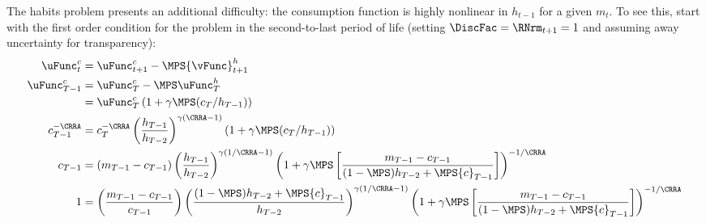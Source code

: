 \documentclass[\econtexRoot/SolvingMicroDSOPs]{subfiles}
\begin{document}
The habits problem presents an additional difficulty: the consumption
function is highly nonlinear in $h_{t-1}$ for a given ${m}_{t}$.   To
see this, start with the first order condition for the problem in the
second-to-last period of life (setting $\DiscFac = \RNrm_{t+1} = 1$ and assuming
away uncertainty for transparency):
\begin{equation}\begin{gathered}\begin{aligned}
  \uFunc_{t}^{c}    & = \uFunc_{t+1}^{c} - \MPS {\vFunc}_{t+1}^{h}
  \\      \uFunc_{T-1}^{c}  & = \uFunc_{T}^{c} - \MPS \uFunc_{T}^{h}
  \\   & =  \uFunc_{T}^{c}\left(1 + \gamma \MPS
         ({c}_{T}/h_{T-1})\right)
  \\      {c}_{T-1}^{-\CRRA}
                    & =                                      {c}_{T}^{-\CRRA}\left(\frac{h_{T-1}}{h_{T-2}}\right)^{\gamma(\CRRA-1)}\left(1 + \gamma \MPS
                      ({c}_{T}/h_{T-1})\right)  \\
  {c}_{T-1}
                    & =                     ({m}_{T-1}-{c}_{T-1})\left(\frac{h_{T-1}}{h_{T-2}}\right)^{\gamma(1/\CRRA-1)}\left(1 +
                      \gamma \MPS \left[\frac{{m}_{T-1}-{c}_{T-1}}{(1-\MPS)h_{T-2}+\MPS
                      {c}_{T-1}}\right]\right)^{-1/\CRRA}
  \\      1
                    & =                     \left(\frac{{m}_{T-1}-{c}_{T-1}}{{c}_{T-1}}\right)\left(\frac{(1-\MPS)h_{T-2}+\MPS {c}_{T-1}}{h_{T-2}}\right)^{\gamma(1/\CRRA-1)}\left(1 +
                      \gamma \MPS \left[\frac{{m}_{T-1}-{c}_{T-1}}{(1-\MPS)h_{T-2}+\MPS
                      {c}_{T-1}}\right]\right)^{-1/\CRRA} \nonumber
  \\ \label{eq:oneeq}
\end{aligned}\end{gathered}\end{equation}
\end{document}
